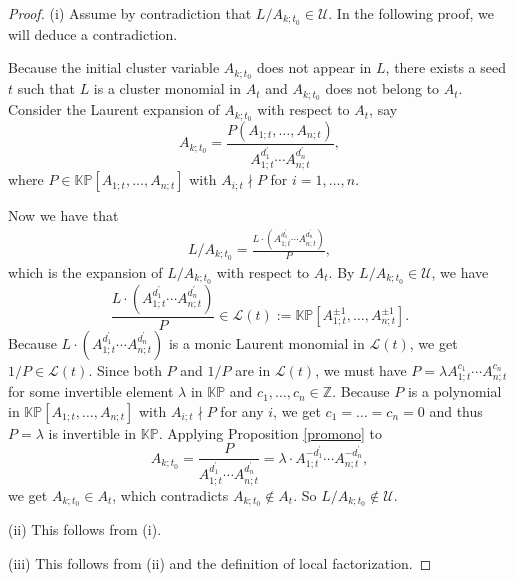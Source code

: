 \documentclass{amsart}
\theoremstyle{definition}
\theoremstyle{remark}
\numberwithin{equation}{section}
\begin{document}
\begin{proof}
(i) Assume by contradiction that  $L/A_{k;t_0}\in\mathcal U$. In the following proof, we will deduce a contradiction.


Because the initial cluster variable $A_{k;t_0}$ does not appear in $L$, there exists a seed $t$ such that $L$ is a cluster monomial in $A_t$ and $A_{k;t_0}$ does not belong to $A_t$. Consider the Laurent expansion of $A_{k;t_0}$ with respect to $A_t$, say
$$A_{k;t_0}=\frac{P(A_{1;t},\ldots,A_{n;t})}{A_{1;t}^{d_1^\prime}\cdots A_{n;t}^{d_n^\prime}},$$
where $P\in\mathbb {KP}[A_{1;t},\ldots,A_{n;t}]$ with $A_{i;t}\nmid P$ for $i=1,\ldots,n$.


Now we have that
\begin{eqnarray}
L/A_{k;t_0}=\frac{L\cdot (A_{1;t}^{d_1^\prime}\cdots A_{n;t}^{d_n^\prime})}{P},\nonumber
\end{eqnarray}
which is the expansion of $L/A_{k;t_0}$ with respect to $A_t$.
By $L/A_{k;t_0}\in\mathcal U$, we have  $$\frac{L\cdot (A_{1;t}^{d_1^\prime}\cdots A_{n;t}^{d_n^\prime})}{P} \in{\mathcal L}(t):=\mathbb {KP}[A_{1;t}^{\pm 1},\ldots,A_{n;t}^{\pm1}].$$
 Because $L\cdot (A_{1;t}^{d_1^\prime}\cdots A_{n;t}^{d_n^\prime})$ is a monic Laurent monomial in  ${\mathcal L}(t)$, we get
 $1/P\in{\mathcal L}(t)$. Since both $P$ and $1/P$ are in ${\mathcal L}(t)$, we must have $P=\lambda A_{1;t}^{c_1}\cdots A_{n;t}^{c_n}$ for some invertible element $\lambda$ in $\mathbb{KP}$ and $c_1,\ldots,c_n\in\mathbb Z$. Because  $P$ is a polynomial in $\mathbb {KP}[A_{1;t},\ldots,A_{n;t}]$ with $A_{i;t}\nmid P$ for any $i$, we get $c_1=\ldots=c_n=0$ and thus $P=\lambda$ is invertible in $\mathbb{KP}$.
  Applying  Proposition \ref{promono} to
  $$A_{k;t_0}=\frac{P}{A_{1;t}^{d_1^\prime}\cdots A_{n;t}^{d_n^\prime}}=\lambda\cdot A_{1;t}^{-d_1^\prime}\cdots A_{n;t}^{-d_n^\prime},$$
  we get  $A_{k;t_0}\in A_t$, which contradicts $A_{k;t_0}\notin A_t$. So $L/A_{k;t_0}\notin\mathcal U$.

  (ii) This follows from (i).

  (iii)  This follows from (ii) and the definition of local factorization.
\end{proof}
\end{document}
